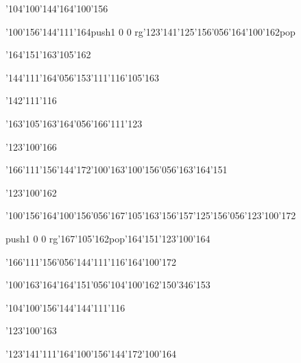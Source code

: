 \null\vfill\ipa\centerline{\enskip\char'104\char'100\char'144\enskip\enskip\enskip\enskip\char'164\char'100\char'156}\medskip\centerline{\enskip\char'100\char'156\enskip\enskip\enskip\char'144\char'111\char'164\enskip\enskip\enskip\enskip\enskip\pdfcolorstack\match push{1 0 0 rg}\char'123\char'141\char'125\char'156\char'056\char'164\char'100\char'162\pdfcolorstack\match pop{}}\medskip\centerline{\enskip\enskip\enskip\enskip\enskip\enskip\enskip\enskip\char'164\char'151\enskip\enskip\enskip\enskip\char'163\char'105\char'162}\medskip\centerline{\enskip\char'144\char'111\char'164\char'056\char'153\char'111\char'116\enskip\char'105\char'163\enskip\enskip\enskip\enskip\enskip\enskip}\medskip\centerline{\enskip\enskip\enskip\enskip\enskip\enskip\enskip\enskip\enskip\enskip\enskip\char'142\char'111\char'116}\medskip\centerline{\enskip\enskip\enskip\enskip\enskip\char'163\char'105\char'163\char'164\char'056\char'166\char'111\char'123\enskip\enskip\enskip\enskip}\medskip\centerline{\enskip\enskip\enskip\enskip\enskip\enskip\enskip\enskip\enskip\enskip\enskip\char'123\char'100\char'166}\medskip\centerline{\enskip\enskip\enskip\enskip\enskip\char'166\char'111\char'156\char'144\char'172\enskip\char'100\char'163\enskip\char'100\char'156\char'056\char'163\char'164\char'151}\medskip\vfill\footline{\hfil\tt\folio\hfil}\eject
\null\vfill\ipa\centerline{\enskip\enskip\enskip\enskip\enskip\enskip\enskip\char'123\char'100\char'162}\medskip\centerline{\enskip\char'100\char'156\enskip\enskip\enskip\char'164\char'100\char'156\char'056\char'167\char'105\char'163\enskip\char'156\char'157\char'125\char'156\char'056\char'123\char'100\char'172}\medskip\centerline{\enskip\pdfcolorstack\match push{1 0 0 rg}\char'167\char'105\char'162\pdfcolorstack\match pop{}\enskip\enskip\enskip\enskip\enskip\enskip\enskip\char'164\char'151\enskip\char'123\char'100\char'164}\medskip\centerline{\enskip\char'166\char'111\char'156\char'056\char'144\char'111\char'116\enskip\enskip\enskip\enskip\enskip\enskip\char'164\char'100\char'172}\medskip\centerline{\enskip\char'100\char'163\char'164\enskip\char'164\char'151\char'056\char'104\char'100\char'162\enskip\char'150\char'346\char'153}\medskip\centerline{\enskip\enskip\enskip\enskip\enskip\char'104\char'100\char'156\char'144\enskip\enskip\enskip\enskip\char'144\char'111\char'116}\medskip\centerline{\enskip\enskip\enskip\enskip\enskip\enskip\enskip\char'123\char'100\char'163\enskip\enskip\enskip\enskip}\medskip\centerline{\enskip\char'123\char'141\char'111\enskip\char'164\char'100\char'156\char'144\char'172\enskip\char'100\char'164\enskip\enskip\enskip\enskip\enskip\enskip}\medskip\vfill\footline{\hfil\tt\folio\hfil}\eject
